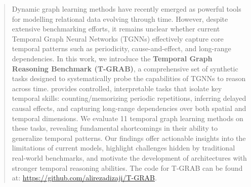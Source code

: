 \begin{abstract}

Dynamic graph learning methods have recently emerged as powerful tools for modelling relational data evolving through time. However, despite extensive benchmarking efforts, it remains unclear whether current Temporal Graph Neural Networks (TGNNs) effectively capture core temporal patterns such as periodicity, cause-and-effect, and long-range dependencies. In this work, we introduce the \textbf{Temporal Graph Reasoning Benchmark (T-GRAB)}, a comprehensive set of synthetic tasks designed to systematically probe the capabilities of TGNNs to reason across time. \benchmarkname provides controlled, interpretable tasks that isolate key temporal skills: counting/memorizing periodic repetitions, inferring delayed causal effects, and capturing long-range dependencies over both spatial and temporal dimensions. We evaluate 11 temporal graph learning methods on these tasks, revealing fundamental shortcomings in their ability to generalize temporal patterns. Our findings offer actionable insights into the limitations of current models, highlight challenges hidden by traditional real-world benchmarks, and motivate the development of architectures with stronger temporal reasoning abilities. The code for T-GRAB can be found at: \url{https://github.com/alirezadizaji/T-GRAB}.
\end{abstract}
